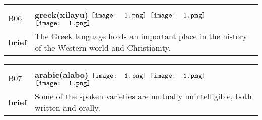 \documentclass[UTF8]{article}
\begin{document}
            \begin{tabularx}{\textwidth}{p{1.5cm}X}
            \arrayrulecolor{myBlue}
        	\hline\\
            \small{B06}&
            \large{\bfseries{greek(xilayu)}}\hfill
                                                            \phantom{$\vcenter{\hbox{\texttt{[image: 1.png]}}}$}
                                                                \phantom{$\vcenter{\hbox{\texttt{[image: 1.png]}}}$}
                                                                $\vcenter{\hbox{\texttt{[image: 1.png]}}}$
                                                                \phantom{$\vcenter{\hbox{\texttt{[image: 1.png]}}}$}
                                                                $\vcenter{\hbox{\texttt{[image: 1.png]}}}$
                                                                $\vcenter{\hbox{\texttt{[image: 1.png]}}}$
                                                                \phantom{$\vcenter{\hbox{\texttt{[image: 1.png]}}}$}
                                        \\[10pt]
            \large{\bfseries{brief}}&\noindent\parbox[c]{\hsize}{The Greek language holds an important place in the history of the Western world and Christianity.} \\[5pt]
            \hline\\[-10pt]
        \end{tabularx}
            \begin{tabularx}{\textwidth}{p{1.5cm}X}
            \arrayrulecolor{myBlue}
        	\hline\\
            \small{B07}&
            \large{\bfseries{arabic(alabo)}}\hfill
                                                            $\vcenter{\hbox{\texttt{[image: 1.png]}}}$
                                                                \phantom{$\vcenter{\hbox{\texttt{[image: 1.png]}}}$}
                                                                $\vcenter{\hbox{\texttt{[image: 1.png]}}}$
                                                                \phantom{$\vcenter{\hbox{\texttt{[image: 1.png]}}}$}
                                                                \phantom{$\vcenter{\hbox{\texttt{[image: 1.png]}}}$}
                                                                $\vcenter{\hbox{\texttt{[image: 1.png]}}}$
                                                                \phantom{$\vcenter{\hbox{\texttt{[image: 1.png]}}}$}
                                        \\[10pt]
            \large{\bfseries{brief}}&\noindent\parbox[c]{\hsize}{Some of the spoken varieties are mutually unintelligible, both written and orally.} \\[5pt]
            \hline\\[-10pt]
        \end{tabularx}
\end{document}
